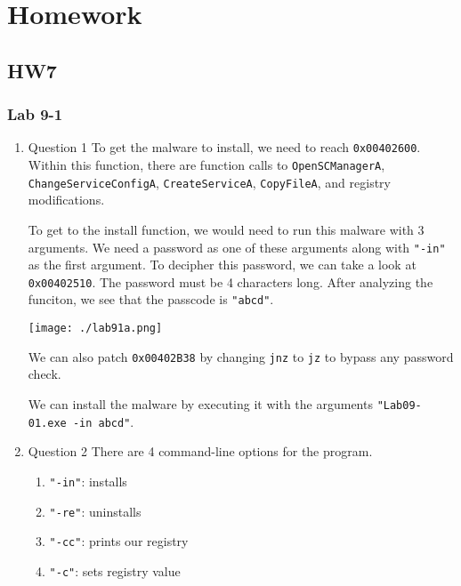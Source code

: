 \documentclass[11pt]{article}
\author{Andrew Park}
\date{\today}
\title{}
\begin{document}
\tableofcontents

\section{Homework}
\label{sec:org92d9779}
\subsection{HW7}
\label{sec:org32b18c6}
\subsubsection{Lab 9-1}
\label{sec:org2dcdea6}
\begin{enumerate}
\item Question 1
\label{sec:org7d58fe6}
To get the malware to install, we need to reach \texttt{0x00402600}. Within this function, there are function calls to \texttt{OpenSCManagerA}, \texttt{ChangeServiceConfigA}, \texttt{CreateServiceA}, \texttt{CopyFileA}, and registry modifications. 

To get to the install function, we would need to run this malware with 3 arguments. We need a password as one of these arguments along with \texttt{"-in"} as the first argument. To decipher this password, we can take a look at \texttt{0x00402510}. The password must be 4 characters long. After analyzing the funciton, we see that the passcode is \texttt{"abcd"}. 

\begin{center}
\texttt{[image: ./lab91a.png]}
\end{center}

We can also patch \texttt{0x00402B38} by changing \texttt{jnz} to \texttt{jz} to bypass any password check.

We can install the malware by executing it with the arguments \texttt{"Lab09-01.exe -in abcd"}.
\item Question 2
\label{sec:org870bbe6}
There are 4 command-line options for the program.

\begin{enumerate}
\item \texttt{"-in"}: installs

\item \texttt{"-re"}: uninstalls

\item \texttt{"-cc"}: prints our registry

\item \texttt{"-c"}: sets registry value
\end{enumerate}


\end{enumerate}
\end{document}
